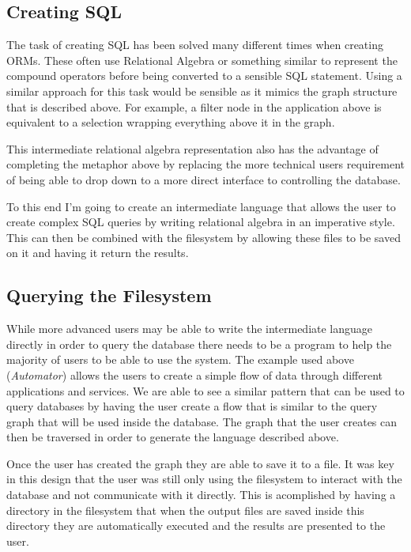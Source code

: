 \subsection{Creating SQL}

The task of creating \ac{SQL} has been solved many different times when
creating \acp{ORM}. These often use Relational Algebra or something similar to
represent the compound operators before being converted to a sensible SQL
statement. Using a similar approach for this task would be sensible as it
mimics the graph structure that is described above. For example, a filter node
in the application above is equivalent to a selection wrapping everything above
it in the graph.

This intermediate relational algebra representation also has the advantage of
completing the metaphor above by replacing the more technical users requirement
of being able to drop down to a more direct interface to controlling the
database.

To this end I'm going to create an intermediate language that allows the user
to create complex \ac{SQL} queries by writing relational algebra in an
imperative style. This can then be combined with the filesystem by allowing
these files to be saved on it and having it return the results.

\subsection{Querying the Filesystem}

While more advanced users may be able to write the intermediate language
directly in order to query the database there needs to be a program to help the
majority of users to be able to use the system. The example used above
(\emph{Automator}) allows the users to create a simple flow of data through
different applications and services. We are able to see a similar pattern that
can be used to query databases by having the user create a flow that is similar
to the query graph that will be used inside the database. The graph that the
user creates can then be traversed in order to generate the language described
above.

Once the user has created the graph they are able to save it to a file. It was
key in this design that the user was still only using the filesystem to interact
with the database and not communicate with it directly. This is acomplished by
having a directory in the filesystem that when the output files are saved
inside this directory they are automatically executed and the results are
presented to the user.
